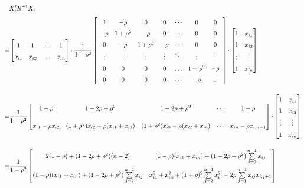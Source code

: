 \documentclass[11pt, a4paper]{article}
\begin{document}
\begin{itemize}
\begin{align*}
&
X_i'R^{-1}X_i \\[0.2em]
=
&
\begin{bmatrix}
1 & 1 & \ldots & 1 \\
x_{i1} & x_{i2} & \ldots & x_{in}
\end{bmatrix}
\cdot
{
\renewcommand{\arraystretch}{1.5}
\dfrac{1}{1 - \rho^2}
\left[
\begin{array}{ccccccc}
1 & -\rho & 0 & 0 & \cdots & 0 & 0 \\
-\rho & 1+\rho^2 & -\rho & 0 & \cdots & 0 & 0 \\
0 & -\rho & 1+\rho^2 & -\rho & \cdots & 0 & 0 \\
\vdots & \vdots & \vdots & \vdots & \ddots & \vdots & \vdots \\
0 & 0 & 0 & 0 & \ldots & 1+\rho^2 & -\rho \\
0 & 0 & 0 & 0 & \cdots & -\rho & 1
\end{array}
\right]
}
\cdot
\begin{bmatrix}
1 & x_{i1} \\
1 & x_{i2} \\
\vdots & \vdots \\
1 & x_{in}
\end{bmatrix}
\\[1em]
=
&
\dfrac{1}{1-\rho^2}
\begin{bmatrix}
1-\rho & 1-2\rho+\rho^2 & 1-2\rho+\rho^2 & \cdots & 1-\rho \\[1em]
x_{i1}-\rho x_{i2} & (1+\rho^2)x_{i2}-\rho(x_{i1}+x_{i3}) & (1+\rho^2)x_{i3}-\rho(x_{i2}+x_{i4}) & \cdots & x_{in}-\rho x_{i,n-1}
\end{bmatrix}
\cdot
\begin{bmatrix}
1 & x_{i1} \\
1 & x_{i2} \\
\vdots & \vdots \\
1 & x_{in}
\end{bmatrix}
\\[1em]
=
&
\dfrac{1}{1-\rho^2}
\begin{bmatrix}
2(1-\rho) + (1-2\rho+\rho^2)(n-2) & (1-\rho)(x_{i1} + x_{in}) + (1-2\rho+\rho^2) \sum \limits_{j = 2}^{n-1} x_{ij} \\[1em]
(1-\rho)(x_{i1} + x_{in}) + (1-2\rho+\rho^2) \sum \limits_{j = 2}^{n-1} x_{ij} & x_{i1}^2 + x_{in}^2 + (1+\rho)^2 \sum \limits_{j = 2}^{n-1} x_{ij}^2 - 2\rho \sum \limits_{j = 1}^{n-1}x_{ij}x_{i,j+1}
\end{bmatrix}
\\[1em]

\end{align*}
\end{itemize}
\end{document}
